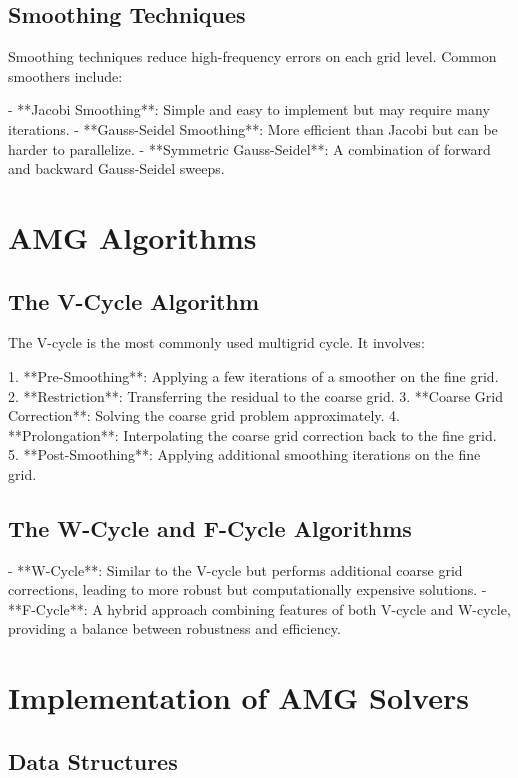 \subsection{Smoothing Techniques}

Smoothing techniques reduce high-frequency errors on each grid level. Common smoothers include:

- **Jacobi Smoothing**: Simple and easy to implement but may require many iterations.
- **Gauss-Seidel Smoothing**: More efficient than Jacobi but can be harder to parallelize.
- **Symmetric Gauss-Seidel**: A combination of forward and backward Gauss-Seidel sweeps.

\section{AMG Algorithms}

\subsection{The V-Cycle Algorithm}

The V-cycle is the most commonly used multigrid cycle. It involves:

1. **Pre-Smoothing**: Applying a few iterations of a smoother on the fine grid.
2. **Restriction**: Transferring the residual to the coarse grid.
3. **Coarse Grid Correction**: Solving the coarse grid problem approximately.
4. **Prolongation**: Interpolating the coarse grid correction back to the fine grid.
5. **Post-Smoothing**: Applying additional smoothing iterations on the fine grid.

\subsection{The W-Cycle and F-Cycle Algorithms}

- **W-Cycle**: Similar to the V-cycle but performs additional coarse grid corrections, leading to more robust but computationally expensive solutions.
- **F-Cycle**: A hybrid approach combining features of both V-cycle and W-cycle, providing a balance between robustness and efficiency.

\section{Implementation of AMG Solvers}

\subsection{Data Structures}

